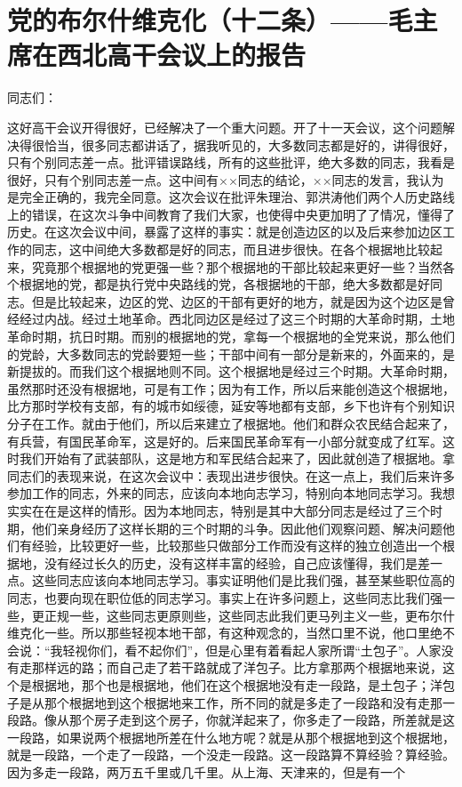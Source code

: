 \section[党的布尔什维克化（十二条）——毛主席在西北高干会议上的报告（一九四二年十一月二十一日）]{党的布尔什维克化（十二条）——毛主席在西北高干会议上的报告}


同志们：

这好高干会议开得很好，已经解决了一个重大问题。开了十一天会议，这个问题解决得很恰当，很多同志都讲话了，据我听见的，大多数同志都是好的，讲得很好，只有个别同志差一点。批评错误路线，所有的这些批评，绝大多数的同志，我看是很好，只有个别同志差一点。这中间有××同志的结论，××同志的发言，我认为是完全正确的，我完全同意。这次会议在批评朱理治、郭洪涛他们两个人历史路线上的错误，在这次斗争中间教育了我们大家，也使得中央更加明了了情况，懂得了历史。在这次会议中间，暴露了这样的事实：就是创造边区的以及后来参加边区工作的同志，这中间绝大多数都是好的同志，而且进步很快。在各个根据地比较起来，究竟那个根据地的党更强一些？那个根据地的干部比较起来更好一些？当然各个根据地的党，都是执行党中央路线的党，各根据地的干部，绝大多数都是好同志。但是比较起来，边区的党、边区的干部有更好的地方，就是因为这个边区是曾经经过内战。经过土地革命。西北同边区是经过了这三个时期的大革命时期，土地革命时期，抗日时期。而别的根据地的党，拿每一个根据地的全党来说，那么他们的党龄，大多数同志的党龄要短一些；干部中间有一部分是新来的，外面来的，是新提拔的。而我们这个根据地则不同。这个根据地是经过三个时期。大革命时期，虽然那时还没有根据地，可是有工作；因为有工作，所以后来能创造这个根据地，比方那时学校有支部，有的城市如绥德，延安等地都有支部，乡下也许有个别知识分子在工作。就由于他们，所以后来建立了根据地。他们和群众农民结合起来了，有兵营，有国民革命军，这是好的。后来国民革命军有一小部分就变成了红军。这时我们开始有了武装部队，这是地方和军民结合起来了，因此就创造了根据地。拿同志们的表现来说，在这次会议中：表现出进步很快。在这一点上，我们后来许多参加工作的同志，外来的同志，应该向本地向志学习，特别向本地同志学习。我想实实在在是这样的情形。因为本地同志，特别是其中大部分同志是经过了三个时期，他们亲身经历了这样长期的三个时期的斗争。因此他们观察问题、解决问题他们有经验，比较更好一些，比较那些只做部分工作而没有这样的独立创造出一个根据地，没有经过长久的历史，没有这样丰富的经验，自己应该懂得，我们是差一点。这些同志应该向本地同志学习。事实证明他们是比我们强，甚至某些职位高的同志，也要向现在职位低的同志学习。事实上在许多问题上，这些同志比我们强一些，更正规一些，这些同志更原则些，这些同志此我们更马列主义一些，更布尔什维克化一些。所以那些轻视本地干部，有这种观念的，当然口里不说，他口里绝不会说：“我轻视你们，看不起你们”，但是心里有着看起人家所谓“土包子”。人家没有走那样远的路；而自己走了若干路就成了洋包子。比方拿那两个根据地来说，这个是根据地，那个也是根据地，他们在这个根据地没有走一段路，是土包子；洋包子是从那个根据地到这个根据地来工作，所不同的就是多走了一段路和没有走那一段路。像从那个房子走到这个房子，你就洋起来了，你多走了一段路，所差就是这一段路，如果说两个根据地所差在什么地方呢？就是从那个根据地到这个根据地，就是一段路，一个走了一段路，一个没走一段路。这一段路算不算经验？算经验。因为多走一段路，两万五千里或几千里。从上海、天津来的，但是有一个